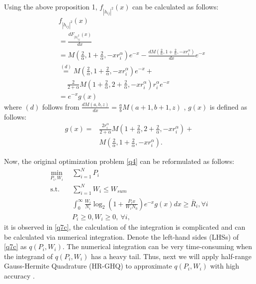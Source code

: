 \documentclass[journal]{IEEEtran}
\begin{document}
Using the above proposition 1, $f_{\left|h_{ij} \right|^2} \left(x\right)$ can be calculated as follows:
\begin{align}
&f_{\left|h_{ij} \right|^2} \left(x\right)\nonumber \\ &= \frac{d F_{\left|h\right|_{ij}^2}\left(x\right)}{d x} \nonumber \\
&=M\left(\frac{2}{\alpha}, 1 + \frac{2}{\alpha}, -xr_i^{\alpha}\right)e^{-x} -\frac{d M\left(\frac{2}{\alpha}, 1 + \frac{2}{\alpha}, -x r_i^{\alpha}\right)}{d x} e^{-x} \nonumber \\
&\overset{\left(d\right)}{=} M\left(\frac{2}{\alpha}, 1 + \frac{2}{\alpha}, -xr_i^{\alpha}\right)e^{-x} + \nonumber \\ & \quad \ \frac{2}{2+\alpha}M\left(1 + \frac{2}{\alpha}, 2+\frac{2}{\alpha}, -xr_i^{\alpha}\right)r_i^{\alpha}e^{-x} \nonumber \\
& = e^{-x}g\left(x\right)
\end{align}
where $\left(d\right)$ follows from $\frac{d M\left(a, b, z\right)}{d x} = \frac{a}{b}M\left(a+1, b+1, z\right)$ \cite[13.4.8]{MAbramowitz}, $g\left(x\right)$ is defined as follows:
\begin{align}
g\left(x\right) =& \frac{2r_i^{\alpha}}{2+\alpha} M\left(1 + \frac{2}{\alpha}, 2+ \frac{2}{\alpha}, -xr_i^{\alpha}\right) + \nonumber \\ & M\left(\frac{2}{\alpha}, 1 + \frac{2}{\alpha}, -xr_i^{\alpha}\right).
\end{align}

Now, the original optimization problem \eqref{q4} can be reformulated as follows:
\begin{subequations}\label{q7}
	\begin{align}
	\min_{P_i, W_i}\ & \sum\limits_{i = 1}^{N} P_i \label{q7a} \\ \mbox{s.t.} \quad &  \sum\limits_{i = 1}^{N} W_i \leq W_{sum} \label{q7b} \\ \quad &  \int_{0}^{\infty} \frac{W_i}{N_i} \log_2\left(1 + \frac{P_i x}{W_i N_0}\right) e^{-x}g\left(x\right) dx \geq \bar{R}_i, \forall i \label{q7c}\\
	& P_i \geq 0, W_i \geq 0, \ \forall i, \label{q7d}
	\end{align}
\end{subequations}
it is observed in \eqref{q7c}, the calculation of the integration is complicated and can be calculated via numerical integration. Denote the left-hand sides (LHSs) of \eqref{q7c} as $q\left(P_i, W_i\right)$. The numerical integration can be very time-consuming when the integrand of $q\left(P_i, W_i\right)$ has a heavy tail. Thus, next we will apply half-range Gauss-Hermite Quadrature (HR-GHQ) to approximate $q\left(P_i, W_i\right)$ with high accuracy \cite{JSBall,NMSteen}.
\end{document}
